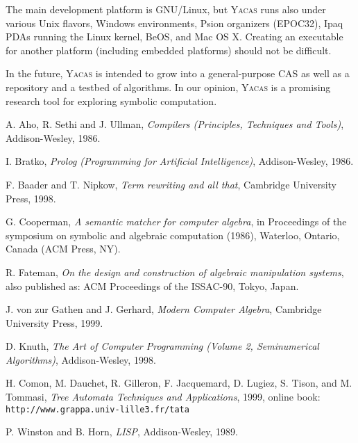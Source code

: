 \documentclass{llncs}
\begin{document}
The main development platform is GNU/Linux, but \textsc{Yacas} runs also
under various Unix flavors,  Windows environments, Psion organizers (EPOC32),
Ipaq PDAs running the Linux kernel, BeOS, and Mac OS X. Creating an
executable for another platform (including embedded platforms) should not be
difficult.

In the future, \textsc{Yacas} is intended to grow into a general-purpose CAS as well as a repository and a testbed of algorithms.
In our opinion, \textsc{Yacas} is a promising research tool for exploring symbolic computation.


\begin{thebibliography}{TATW99}

 A. Aho, R. Sethi and J. Ullman, \emph{Compilers (Principles, Techniques and Tools)}, Addison-Wesley, 1986.


 I. Bratko, \emph{Prolog (Programming for Artificial Intelligence)}, Addison-Wesley, 1986.


 F. Baader and T. Nipkow, \emph{Term rewriting and all that}, Cambridge University Press, 1998.


 G. Cooperman, \emph{A semantic matcher for computer algebra}, in Proceedings of the symposium on symbolic and algebraic computation (1986), Waterloo, Ontario, Canada (ACM Press, NY).


 R. Fateman, \emph{On the design and construction of algebraic manipulation systems}, also published as: ACM Proceedings of the ISSAC-90, Tokyo, Japan.


 J. von zur Gathen and J. Gerhard, \emph{Modern Computer Algebra}, Cambridge University Press, 1999.


 D. Knuth, \emph{The Art of Computer Programming (Volume 2, Seminumerical Algorithms)}, Addison-Wesley, 1998.




 H. Comon, M. Dauchet, R. Gilleron, F. Jacquemard, D. Lugiez, S. Tison, and M. Tommasi, \emph{Tree Automata Techniques and Applications}, 1999, online book: {\small \verb|http://www.grappa.univ-lille3.fr/tata|}




 P. Winston and B. Horn, \emph{LISP}, Addison-Wesley, 1989.


\end{thebibliography}
\end{document}
